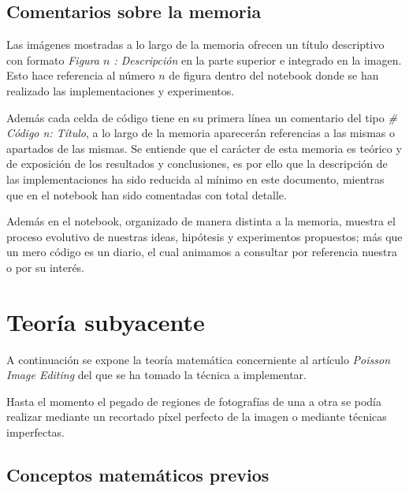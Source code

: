\documentclass[11pt,twoside,titlepage,a4paper]{article}
\numberwithin{equation}{section} %
\theoremstyle{usual}
\begin{document}
\subsection{Comentarios sobre la memoria}  

Las imágenes mostradas a lo largo de la memoria ofrecen un título descriptivo con formato \textit{Figura $n$ : Descripción} en la parte superior e integrado en la imagen. Esto hace referencia al número $n$ de figura dentro del notebook donde se han realizado las implementaciones y experimentos.  

Además cada celda de código tiene en su primera línea un comentario del tipo \textit{\# Código n: Título}, a lo largo de la memoria aparecerán referencias a las mismas o apartados de las mismas. Se entiende que el carácter de esta memoria es teórico y de exposición de los resultados y conclusiones, es por ello que la descripción de las implementaciones ha sido reducida al mínimo en este documento, mientras que en el notebook han sido comentadas con total detalle. 

Además en el notebook, organizado de manera distinta a la memoria, muestra el proceso evolutivo de nuestras ideas, hipótesis y experimentos propuestos; más que un mero código es un diario, el cual animamos a consultar por referencia nuestra o por su interés. 


\newpage


\section{Teoría subyacente}

A continuación se expone la teoría matemática concerniente al artículo \textit{Poisson Image Editing} \cite{poissonImageEditing} del que se ha tomado la técnica a implementar. 




Hasta el momento el pegado de regiones de fotografías de una a otra se podía realizar mediante un recortado píxel perfecto de la imagen o mediante técnicas imperfectas.



\subsection{Conceptos matemáticos previos}
\end{document}
